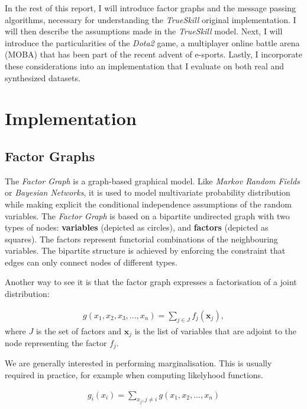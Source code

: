\documentclass[10pt,a4]{article}
\begin{document}
In the rest of this report, I will introduce factor graphs and the message passing 
algorithms, necessary for understanding the \emph{TrueSkill\texttrademark}
original implementation. I will then describe the assumptions made in the 
\emph{TrueSkill\texttrademark} model. Next, I will introduce the particularities 
of the \emph{Dota2} game, a multiplayer online battle arena (MOBA) that has been 
part of the recent advent of e-sports. Lastly, I incorporate these considerations 
into an implementation that I evaluate on both real and synthesized datasets.

\section{Implementation} \label{impl}

\subsection{Factor Graphs}

The \emph{Factor Graph} is a graph-based graphical model. Like \emph{Markov Random Fields}
or \emph{Bayesian Networks}, it is used to model multivariate probability distribution 
while making explicit the conditional independence assumptions of the random variables.
The \emph{Factor Graph} is based on a bipartite undirected graph with two types of nodes:
\textbf{variables} (depicted as circles), and \textbf{factors} (depicted as squares).
The factors represent functorial combinations of the neighbouring variables. The 
bipartite structure is achieved by enforcing the constraint that edges can only
connect nodes of different types.

Another way to see it is that the factor graph expresses a factorisation of a 
joint distribution:

\begin{align*}
	g(x_1, x_2, x_3, ..., x_n)=\sum_{j \in J}f_j(\textbf{x}_j),
\end{align*}
where $J$ is the set of factors and $\textbf{x}_j$ is the list of variables that 
are adjoint to the node representing the factor $f_j$.

We are generally interested in performing marginalisation. This is usually 
required in practice, for example when computing likelyhood functions.

\begin{align*}
	g_i(x_i) = \sum_{x_j, j \neq i}g(x_1, x_2, ..., x_n)
\end{align*}
\end{document}
